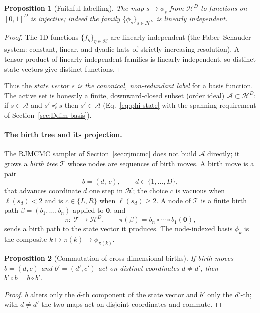\documentclass[11pt]{article}
\newtheorem{proposition}{Proposition}
\begin{document}
\begin{proposition}[Faithful labelling]
\label{prop:phi-injective}
The map $s\mapsto\phi_s$ from $\mathcal{H}^D$ to functions on $[0,1]^D$ is
injective; indeed the family $\{\phi_s\}_{s\in\mathcal{H}^D}$ is linearly
independent.
\end{proposition}
\begin{proof}
The 1D functions $\{f_\eta\}_{\eta\in\mathcal{H}}$ are linearly independent
(the Faber--Schauder system: constant, linear, and dyadic hats of strictly
increasing resolution).  A tensor product of linearly independent families is
linearly independent, so distinct state vectors give distinct functions.
\end{proof}

Thus the \emph{state vector $s$ is the canonical, non-redundant label} for a
basis function.  The active set is honestly a finite, downward-closed subset
(order ideal) $\mathcal{A}\subset\mathcal{H}^D$: if $s\in\mathcal{A}$ and
$s'\preceq s$ then $s'\in\mathcal{A}$ (Eq.~\eqref{eq:phi-state} with the
spanning requirement of Section~\ref{sec:Ddim-basis}).

\paragraph{The birth tree and its projection.}
The RJMCMC sampler of Section~\ref{sec:rjmcmc} does not build $\mathcal{A}$
directly; it grows a \emph{birth tree} $\mathcal{T}$ whose nodes are sequences
of birth moves.  A birth move is a pair
\begin{equation}
  b = (d,\,c),\qquad d\in\{1,\dots,D\},
\end{equation}
that advances coordinate $d$ one step in $\mathcal{H}$; the choice $c$ is vacuous
when $\ell(s_d)<2$ and is $c\in\{L,R\}$ when $\ell(s_d)\ge2$.  A node of
$\mathcal{T}$ is a finite birth path $\beta=(b_1,\dots,b_n)$ applied to
$\mathbf 0$, and
\begin{equation}
  \pi:\;\mathcal{T}\longrightarrow\mathcal{H}^D,
  \qquad
  \pi(\beta) = b_n\circ\cdots\circ b_1(\mathbf 0),
\end{equation}
sends a birth path to the state vector it produces.  The node-indexed basis
$\phi_k$ is the composite $k\mapsto\pi(k)\mapsto\phi_{\pi(k)}$.

\begin{proposition}[Commutation of cross-dimensional births]
\label{prop:commute}
If birth moves $b=(d,c)$ and $b'=(d',c')$ act on distinct coordinates
$d\ne d'$, then $b'\circ b = b\circ b'$.
\end{proposition}
\begin{proof}
$b$ alters only the $d$-th component of the state vector and $b'$ only the
$d'$-th; with $d\ne d'$ the two maps act on disjoint coordinates and commute.
\end{proof}
\end{document}
